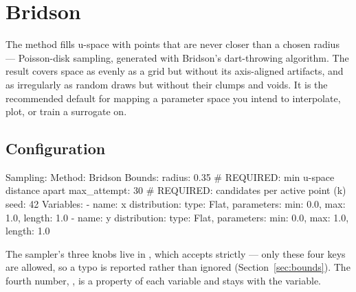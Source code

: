 \chapter{Bridson}
\label{ch:bridson}

 The  method fills u-space with points
that are never closer than a chosen radius --- Poisson-disk sampling, generated with
Bridson's dart-throwing algorithm.\cite{Bridson:2007} The result covers space as evenly
as a grid but without its axis-aligned artifacts, and as irregularly as random draws but
without their clumps and voids. It is the recommended default for mapping a parameter
space you intend to interpolate, plot, or train a surrogate on.

\section{Configuration}
\label{sec:bridson-config}

\begin{yamlwin}
Sampling:
  Method: Bridson
  Bounds:
    radius: 0.35          # REQUIRED: min u-space distance apart
    max_attempt: 30       # REQUIRED: candidates per active point (k)
    seed: 42
  Variables:
    - name: x
      distribution: {type: Flat, parameters: {min: 0.0, max: 1.0, length: 1.0}}
    - name: y
      distribution: {type: Flat, parameters: {min: 0.0, max: 1.0, length: 1.0}}
\end{yamlwin}

The sampler's three knobs live in , which  accepts
strictly --- only these four keys are allowed, so a typo is reported rather than
ignored (Section~\ref{sec:bounds}). The fourth number, , is a property
of each variable and stays with the variable.

